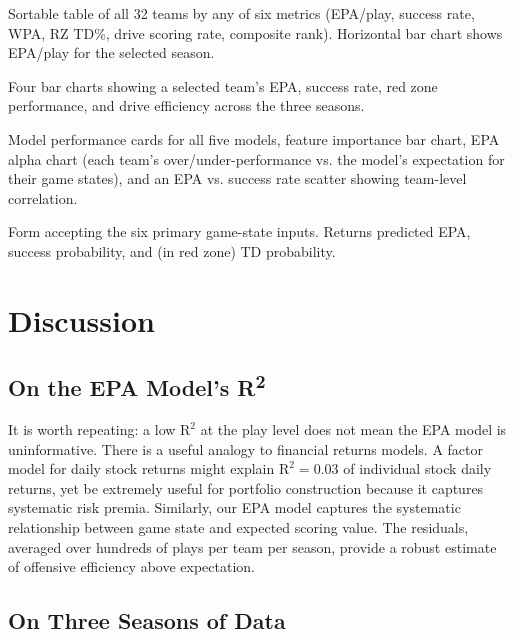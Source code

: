 \documentclass[11pt]{article}
\begin{document}
\begin{description}[leftmargin=2em, itemsep=0pt]
  \item[League Rankings] Sortable table of all 32 teams by any of six metrics
    (EPA/play, success rate, WPA, RZ TD\%, drive scoring rate, composite rank).
    Horizontal bar chart shows EPA/play for the selected season.
  \item[Team Profile] Four bar charts showing a selected team's EPA, success
    rate, red zone performance, and drive efficiency across the three seasons.
  \item[EPA Model] Model performance cards for all five models, feature
    importance bar chart, EPA alpha chart (each team's over/under-performance
    vs. the model's expectation for their game states), and an EPA vs. success
    rate scatter showing team-level correlation.
  \item[Play Predictor] Form accepting the six primary game-state inputs.
    Returns predicted EPA, success probability, and (in red zone) TD probability.
\end{description}

\section{Discussion}
\label{sec:discussion}

\subsection{On the EPA Model's R\textsuperscript{2}}

It is worth repeating: a low $\text{R}^2$ at the play level does not mean the
EPA model is uninformative. There is a useful analogy to financial returns
models. A factor model for daily stock returns might explain $\text{R}^2 = 0.03$
of individual stock daily returns, yet be extremely useful for portfolio
construction because it captures systematic risk premia. Similarly, our EPA
model captures the systematic relationship between game state and expected scoring
value. The residuals, averaged over hundreds of plays per team per season, provide
a robust estimate of offensive efficiency above expectation.

\subsection{On Three Seasons of Data}
\end{document}
